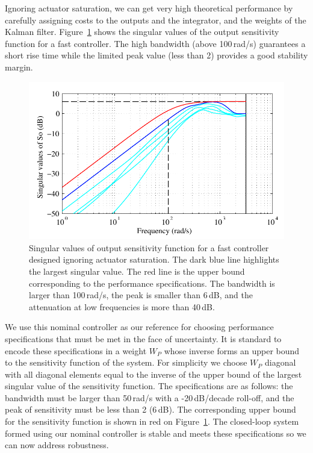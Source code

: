 \documentclass[12pt,lot, lof]{puthesis}
\begin{document}
Ignoring actuator saturation, we can get very high theoretical performance by carefully assigning costs to the outputs and the integrator, and the weights of the Kalman filter. Figure~\ref{fig:best_So} shows the singular values of the output sensitivity function for a fast controller.
The high bandwidth (above 100\,rad/s) guarantees a short rise time while the limited peak value (less than 2) provides a good stability margin.

\begin{figure}[htbp]
	\centering
	\includegraphics{chap10/best_So}
	\caption{Singular values of output sensitivity function for a fast controller designed ignoring actuator saturation.
		The dark blue line highlights the largest singular value.
		The red line is the upper bound corresponding to the performance specifications.
		The bandwidth is larger than 100\,rad/s, the peak is smaller than 6\,dB, and the attenuation at low frequencies is more than 40\,dB.
	}
	\label{fig:best_So}
\end{figure}

We use this nominal controller as our reference for choosing performance specifications that must be met in the face of uncertainty.
It is standard to encode these specifications in a weight $W_P$ whose inverse forms an upper bound to the sensitivity function of the system.
For simplicity we choose $W_P$ diagonal with all diagonal elements equal to the inverse of the upper bound of the largest singular value of the sensitivity function.
The specifications are as follows: the bandwidth must be larger than 50\,rad/s with a -20\,dB/decade roll-off, and the peak of sensitivity must be less than 2 (6\,dB).
The corresponding upper bound for the sensitivity function is shown in red on Figure~\ref{fig:best_So}.
The closed-loop system formed using our nominal controller is stable and meets these specifications so we can now address robustness.
\end{document}
